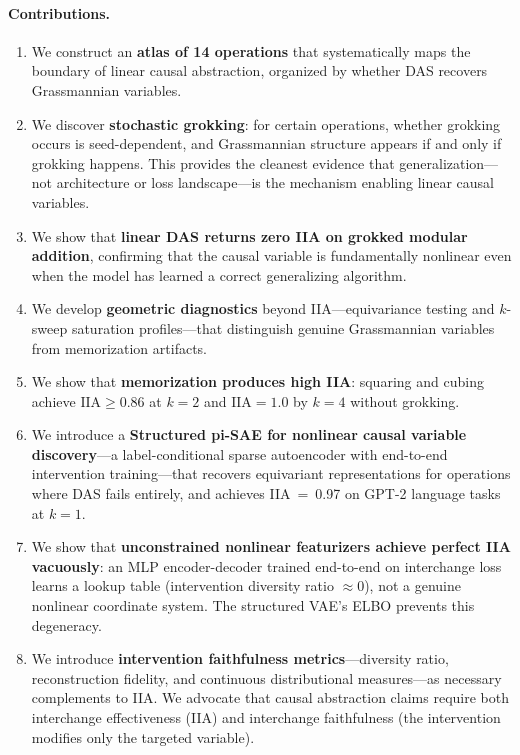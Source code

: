 \documentclass{article}
\newcommand{\IIA}{\mathrm{IIA}}
\begin{document}
\paragraph{Contributions.}
\begin{enumerate}[leftmargin=*]
\item We construct an \textbf{atlas of 14 operations} that systematically maps
  the boundary of linear causal abstraction, organized by whether DAS recovers
  Grassmannian variables.
\item We discover \textbf{stochastic grokking}: for certain operations,
  whether grokking occurs is seed-dependent, and Grassmannian structure appears
  if and only if grokking happens. This provides the cleanest evidence that
  generalization---not architecture or loss landscape---is the mechanism enabling
  linear causal variables.
\item We show that \textbf{linear DAS returns zero IIA on grokked modular
  addition}, confirming that the causal variable is fundamentally nonlinear even
  when the model has learned a correct generalizing algorithm.
\item We develop \textbf{geometric diagnostics} beyond IIA---equivariance testing
  and $k$-sweep saturation profiles---that distinguish genuine Grassmannian
  variables from memorization artifacts.
\item We show that \textbf{memorization produces high IIA}: squaring and cubing
  achieve $\IIA \geq 0.86$ at $k=2$ and $\IIA = 1.0$ by $k=4$ without grokking.
\item We introduce a \textbf{Structured pi-SAE for nonlinear causal variable
  discovery}---a label-conditional sparse autoencoder with end-to-end
  intervention training---that recovers equivariant representations for
  operations where DAS fails entirely, and achieves IIA~=~0.97 on GPT-2
  language tasks at $k{=}1$.
\item We show that \textbf{unconstrained nonlinear featurizers achieve perfect
  IIA vacuously}: an MLP encoder-decoder trained end-to-end on interchange loss
  learns a lookup table (intervention diversity ratio $\approx 0$), not a
  genuine nonlinear coordinate system. The structured VAE's ELBO prevents this
  degeneracy.
\item We introduce \textbf{intervention faithfulness metrics}---diversity ratio,
  reconstruction fidelity, and continuous distributional measures---as necessary
  complements to IIA. We advocate that causal abstraction claims require both
  interchange effectiveness (IIA) and interchange faithfulness (the intervention
  modifies only the targeted variable).
\end{enumerate}
\end{document}
